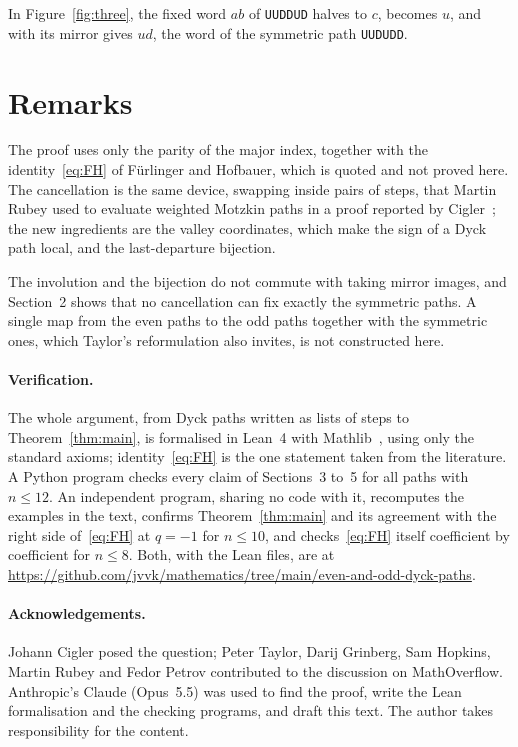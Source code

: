 \documentclass[11pt]{article}
\theoremstyle{remark}
\newcommand{\w}[1]{\texttt{#1}}
\begin{document}
In Figure~\ref{fig:three}, the fixed word $ab$ of \w{UUDDUD} halves to $c$, becomes $u$, and with
its mirror gives $ud$, the word of the symmetric path \w{UUDUDD}.

\section{Remarks}

The proof uses only the parity of the major index, together with the identity~\eqref{eq:FH} of
F\"urlinger and Hofbauer, which is quoted and not proved here. The cancellation is the same device,
swapping inside pairs of steps, that Martin Rubey used to evaluate weighted Motzkin paths in a
proof reported by Cigler~\cite[proof of the Lemma in Section 5]{Cig26b}; the new ingredients are the
valley coordinates, which make the sign of a Dyck path local, and the last-departure bijection.

The involution and the bijection do not commute with taking mirror images, and Section~2
shows that no cancellation can fix exactly the symmetric paths. A single map from the even paths
to the odd paths together with the symmetric ones, which Taylor's reformulation also invites, is
not constructed here.

\paragraph{Verification.} The whole argument, from Dyck paths written as lists of steps to
Theorem~\ref{thm:main}, is formalised in Lean~4 with Mathlib~\cite{mathlib}, using only the standard
axioms; identity~\eqref{eq:FH} is the one statement taken from the literature. A Python program
checks every claim of Sections~3 to~5 for all paths with $n\le 12$. An independent program, sharing
no code with it, recomputes the examples in the text, confirms Theorem~\ref{thm:main} and its
agreement with the right side of~\eqref{eq:FH} at $q=-1$ for $n\le 10$, and checks~\eqref{eq:FH}
itself coefficient by coefficient for $n\le 8$. Both, with the Lean files, are at
\url{https://github.com/jvvk/mathematics/tree/main/even-and-odd-dyck-paths}.

\paragraph{Acknowledgements.} Johann Cigler posed the question; Peter Taylor, Darij Grinberg,
Sam Hopkins, Martin Rubey and Fedor Petrov contributed to the discussion on MathOverflow.
Anthropic's Claude (Opus~5.5) was used to find the proof, write the Lean formalisation and the
checking programs, and draft this text. The author takes responsibility for the content.
\end{document}
